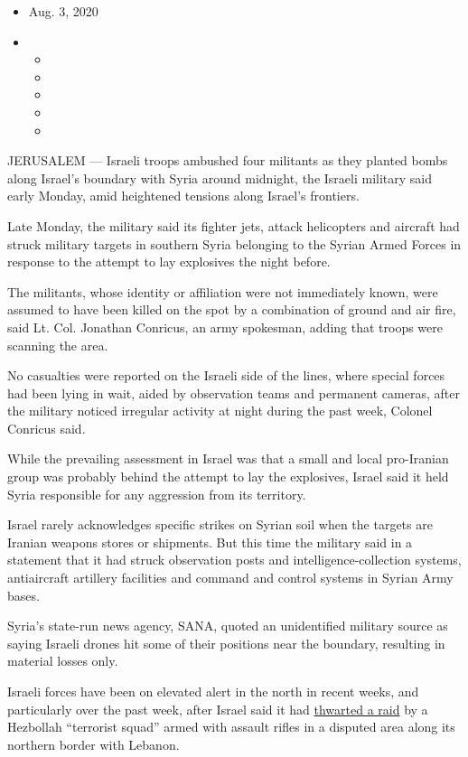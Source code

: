 \begin{itemize}
\item
  Aug. 3, 2020
\item
  \begin{itemize}
  \item
  \item
  \item
  \item
  \item
  \end{itemize}
\end{itemize}

JERUSALEM --- Israeli troops ambushed four militants as they planted
bombs along Israel's boundary with Syria around midnight, the Israeli
military said early Monday, amid heightened tensions along Israel's
frontiers.

Late Monday, the military said its fighter jets, attack helicopters and
aircraft had struck military targets in southern Syria belonging to the
Syrian Armed Forces in response to the attempt to lay explosives the
night before.

The militants, whose identity or affiliation were not immediately known,
were assumed to have been killed on the spot by a combination of ground
and air fire, said Lt. Col. Jonathan Conricus, an army spokesman, adding
that troops were scanning the area.

No casualties were reported on the Israeli side of the lines, where
special forces had been lying in wait, aided by observation teams and
permanent cameras, after the military noticed irregular activity at
night during the past week, Colonel Conricus said.

While the prevailing assessment in Israel was that a small and local
pro-Iranian group was probably behind the attempt to lay the explosives,
Israel said it held Syria responsible for any aggression from its
territory.

Israel rarely acknowledges specific strikes on Syrian soil when the
targets are Iranian weapons stores or shipments. But this time the
military said in a statement that it had struck observation posts and
intelligence-collection systems, antiaircraft artillery facilities and
command and control systems in Syrian Army bases.

Syria's state-run news agency, SANA, quoted an unidentified military
source as saying Israeli drones hit some of their positions near the
boundary, resulting in material losses only.

Israeli forces have been on elevated alert in the north in recent weeks,
and particularly over the past week, after Israel said it had
\href{https://www.nytimes.com/2020/07/27/world/middleeast/israel-hezbollah-lebanon-fighting.html?searchResultPosition=1}{thwarted
a raid} by a Hezbollah ``terrorist squad'' armed with assault rifles in
a disputed area along its northern border with Lebanon.

